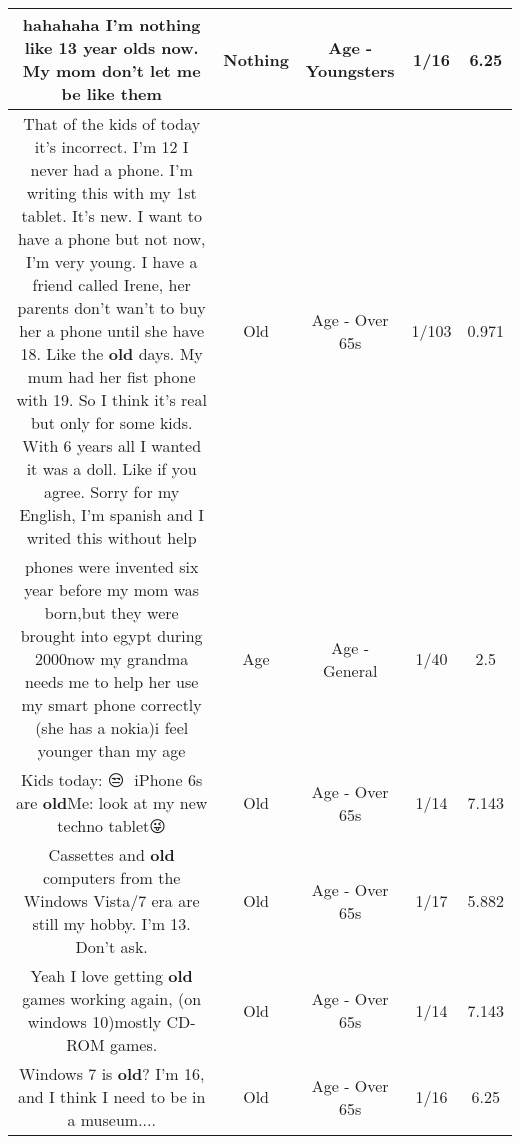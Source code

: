 \documentclass[11pt]{article}
\newlength\mylength
\begin{document}
\begin{center}
\begin{longtable}{|C{.65\mylength}|C{.30\mylength}|C{.12\mylength}|C{.12\mylength}|C{.12\mylength}|}
  \small hahahaha I'm \textbf{nothing} like 13 year olds now. My mom don't let me be like them\normalsize   & Nothing & Age - Youngsters & 1/16 & 6.25 \\  \hline
  \small That of the kids of today it's incorrect. I'm 12 I  never had a phone. I'm writing this with my 1st tablet. It's new. I want to have a phone but not  now, I'm very young. I have a friend called Irene, her parents don't wan't to buy her a phone until she have 18. Like the \textbf{old} days. My mum had her fist phone with 19. So I think it's real but only for some kids. With 6 years all I wanted it was a doll. Like  if you agree. Sorry  for  my English, I'm spanish and I writed this without help\normalsize   & Old & Age - Over 65s & 1/103 & 0.971 \\  \hline
  \small phones were invented six year before my mom was born,but they were brought into egypt during 2000now my grandma needs me to help her use my smart phone correctly (she has a nokia)i feel younger than my age\normalsize   & Age & Age - General & 1/40 & 2.5 \\  \hline
  \small Kids today: 😒📱 iPhone 6s are \textbf{old}Me: look at my new techno tablet😜\normalsize   & Old & Age - Over 65s & 1/14 & 7.143 \\  \hline
  \small Cassettes and \textbf{old} computers from the Windows Vista/7 era are still my hobby. I'm 13. Don't ask.\normalsize   & Old & Age - Over 65s & 1/17 & 5.882 \\  \hline
  \small Yeah I love getting \textbf{old} games working again, (on windows 10)mostly CD-ROM games.\normalsize   & Old & Age - Over 65s & 1/14 & 7.143 \\  \hline
  \small Windows 7 is \textbf{old}? I'm 16, and I think I need to be in a museum....\normalsize   & Old & Age - Over 65s & 1/16 & 6.25 \\  \hline

\end{longtable}
\end{center}
\end{document}
